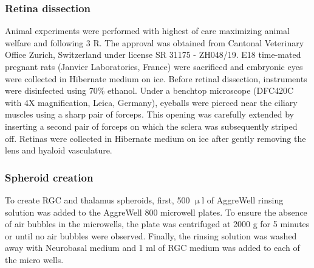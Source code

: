 

\subsubsection{Retina dissection}
\label{dissection}
Animal experiments were performed with highest of care maximizing animal welfare
and following 3 R. The approval was obtained from Cantonal Veterinary Office
Zurich, Switzerland under license SR 31175 - ZH048/19. E18 time-mated pregnant
rats (Janvier Laboratories, France) were sacrificed and embryonic eyes were
collected in Hibernate medium on ice. Before retinal dissection, instruments
were disinfected using 70\% ethanol. Under a benchtop microscope (DFC420C with
4X magnification, Leica, Germany), eyeballs were pierced near the ciliary
muscles using a sharp pair of forceps. This opening was carefully extended by
inserting a second pair of forceps on which the sclera was subsequently striped
off. Retinas were collected in Hibernate medium on ice after gently removing the
lens and hyaloid vasculature.

\subsubsection{Spheroid creation}
To create RGC and thalamus spheroids, first, 500 $\upmu$l of
AggreWell\textsuperscript{\texttrademark} rinsing solution was added to the
AggreWell\textsuperscript{\texttrademark} 800 microwell plates. To ensure the
absence of air bubbles in the microwells, the plate was centrifuged at 2000 g
for 5 minutes or until no air bubbles were observed. Finally, the rinsing
solution was washed away with Neurobasal medium and 1 ml of RGC medium was added
to each of the micro wells. \\

